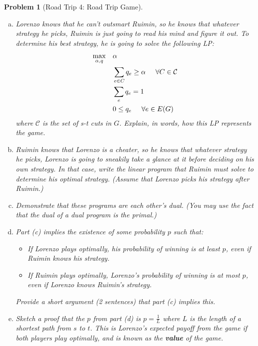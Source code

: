 \documentclass[10pt]{article}
\newtheorem{problem}{\sc\color{cit}Problem}
\begin{document}
\begin{problem}[Road Trip 4: Road Trip Game]
\begin{enumerate}[(a)]
    \item Lorenzo knows that he can't outsmart Ruimin, so he knows that whatever strategy he picks, Ruimin is just going to read his mind and figure it out. To determine his best strategy, he is going to solve the following LP:
    \begin{align*}
        \max_{\alpha, q}\quad& \alpha \\
        &  \sum_{e \in C} q_e \geq \alpha  \hspace{0.5cm} \forall C \in \mathcal{C}\\
        & \sum_e q_e = 1\\
        & 0 \leq q_e  \hspace{0.5cm} \forall e \in E(G)
    \end{align*}
    where $\mathcal{C}$ is the set of s-t cuts in $G$. Explain, in words, how this LP represents the game. 
    \item Ruimin knows that Lorenzo is a cheater, so he knows that whatever strategy he picks, Lorenzo is going to sneakily take a glance at it before deciding on his own strategy. In that case, write the linear program that Ruimin must solve to determine his optimal strategy. (Assume that Lorenzo picks his strategy after Ruimin.)
    \item Demonstrate that these programs are each other's dual. (You may use the fact that the dual of a dual program is the primal.)
    \item Part (c) implies the existence of some probability $p$ such that:
    \begin{itemize}
        \item If Lorenzo plays optimally, his probability of winning is at least $p$, even if Ruimin knows his strategy.
        \item If Ruimin plays optimally, Lorenzo's probability of winning is at most $p$, even if Lorenzo knows Ruimin's strategy.
    \end{itemize}
    Provide a short argument (2 sentences) that part (c) implies this. 
    \item Sketch a proof that the $p$ from part (d) is $p=\frac{1}{L}$ where $L$ is the length of a shortest path from $s$ to $t$. This is Lorenzo's expected payoff from the game if both players play optimally, and is known as the \textbf{value} of the game. 
\end{enumerate}
\end{problem}
\end{document}
